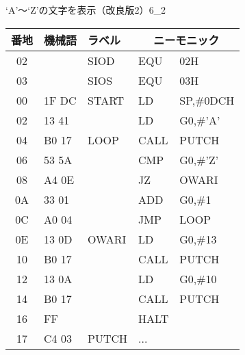 \begin{figure}[btp]
\begin{reidai}{`A'〜`Z'の文字を表示（改良版2）}{6_2}
\begin{description}
{\tt\footnotesize\begin{center}
\begin{tabular}{|c|l|l|l l|} \hline
番地 & 機械語 & ラベル & \multicolumn{2}{|c|}{ニーモニック} \\
\hline
02 &       & SIOD  & EQU  & 02H             \\
03 &       & SIOS  & EQU  & 03H             \\
00 & 1F DC & START & LD   & SP,\#0DCH       \\
02 & 13 41 &       & LD   & G0,\#'A'        \\
04 & B0 17 & LOOP  & CALL & PUTCH           \\
06 & 53 5A &       & CMP  & G0,\#'Z'        \\
08 & A4 0E &       & JZ   & OWARI           \\
0A & 33 01 &       & ADD  & G0,\#1          \\
0C & A0 04 &       & JMP  & LOOP            \\
0E & 13 0D & OWARI & LD   & G0,\#13         \\
10 & B0 17 &       & CALL & PUTCH           \\
12 & 13 0A &       & LD   & G0,\#10         \\
14 & B0 17 &       & CALL & PUTCH           \\
16 & FF    &       & HALT &                 \\
17 & C4 03 & PUTCH & ...   &                \\
\hline
\end{tabular}
\end{center}}
\end{description}
\end{reidai}
\end{figure}

